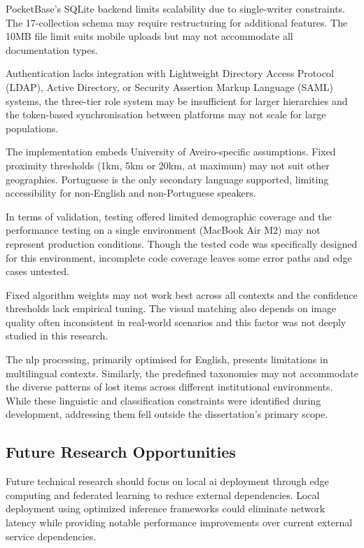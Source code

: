 PocketBase's SQLite backend limits scalability due to single-writer constraints. The 17-collection schema may require restructuring for additional features. The 10MB file limit suits mobile uploads but may not accommodate all documentation types.

Authentication lacks integration with Lightweight Directory Access Protocol (LDAP), Active Directory, or Security Assertion Markup Language (SAML) systems, the three-tier role system may be insufficient for larger hierarchies and the token-based synchronisation between platforms may not scale for large populations.

The implementation embeds University of Aveiro-specific assumptions. Fixed proximity thresholds (1km, 5km or 20km, at maximum) may not suit other geographies. Portuguese is the only secondary language supported, limiting accessibility for non-English and non-Portuguese speakers.

In terms of validation, testing offered limited demographic coverage and the performance testing on a single environment (MacBook Air M2) may not represent production conditions. Though the tested code was specifically designed for this environment, incomplete code coverage leaves some error paths and edge cases untested.

Fixed algorithm weights may not work best across all contexts and the confidence thresholds lack empirical tuning. The visual matching also depends on image quality often inconsistent in real-world scenarios and this factor was not deeply studied in this research.

The \ac{nlp} processing, primarily optimised for English, presents limitations in multilingual contexts. Similarly, the predefined taxonomies may not accommodate the diverse patterns of lost items across different institutional environments. While these linguistic and classification constraints were identified during development, addressing them fell outside the dissertation's primary scope.

\subsection{Future Research Opportunities}

Future technical research should focus on local \ac{ai} deployment through edge computing and federated learning to reduce external dependencies. Local deployment using optimized inference frameworks could eliminate network latency while providing notable performance improvements over current external service dependencies.

